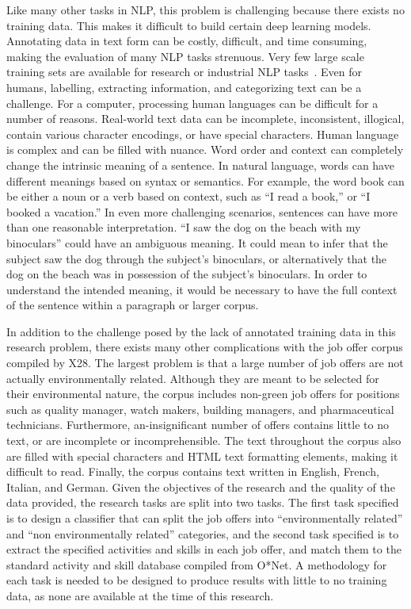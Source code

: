 Like many other tasks in NLP, this problem is challenging because there exists no training data. This makes it difficult to build certain deep learning models. Annotating data in text form can be costly, difficult, and time consuming, making the evaluation of many NLP tasks strenuous. Very few large scale training sets are available for research or industrial NLP tasks~\cite{DBLP:journals/corr/abs-1803-11175}. Even for humans, labelling, extracting information, and categorizing text can be a challenge. For a computer, processing human languages can be difficult for a number of reasons. Real-world text data can be incomplete, inconsistent, illogical, contain various character encodings, or have special characters. Human language is complex and can be filled with nuance. Word order and context can completely change the intrinsic meaning of a sentence. In natural language, words can have different meanings based on syntax or semantics. For example, the word book can be either a noun or a verb based on context, such as ``I read a book,'' or ``I booked a vacation.'' In even more challenging scenarios, sentences can have more than one reasonable interpretation. ``I saw the dog on the beach with my binoculars'' could have an ambiguous meaning. It could mean to infer that the subject saw the dog through the subject’s binoculars, or alternatively that the dog on the beach was in possession of the subject’s binoculars. In order to understand the intended meaning, it would be necessary to have the full context of the sentence within a paragraph or larger corpus. 

In addition to the challenge posed by the lack of annotated training data in this research problem, there exists many other complications with the job offer corpus compiled by X28. The largest problem is that a large number of job offers are not actually environmentally related. Although they are meant to be selected for their environmental nature, the corpus includes non-green job offers for positions such as quality manager, watch makers, building managers, and pharmaceutical technicians. Furthermore, an-insignificant number of offers contains little to no text, or are incomplete or incomprehensible. The text throughout the corpus also are filled with special characters and HTML text formatting elements, making it difficult to read. Finally, the corpus contains text written in English, French, Italian, and German. 
Given the objectives of the research and the quality of the data provided, the research tasks are split into two tasks. The first task specified is to design a classifier that can split the job offers into ``environmentally related” and ``non environmentally related” categories, and the second task specified is to extract the specified activities and skills in each job offer, and match them to the standard activity and skill database compiled from O*Net. A methodology for each task is needed to be designed to produce results with little to no training data, as none are available at the time of this research.

